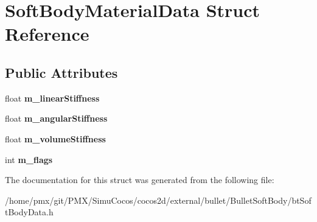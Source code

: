 \hypertarget{structSoftBodyMaterialData}{}\section{Soft\+Body\+Material\+Data Struct Reference}
\label{structSoftBodyMaterialData}
\subsection*{Public Attributes}
\begin{DoxyCompactItemize}
\item 
\mbox{\label{structSoftBodyMaterialData_a10a3ccf32511c85b9eb62ad97553312d}} 
float {\bfseries m\+\_\+linear\+Stiffness}
\item 
\mbox{\label{structSoftBodyMaterialData_adb5b47c720ed05e42e12c74eedba9d8b}} 
float {\bfseries m\+\_\+angular\+Stiffness}
\item 
\mbox{\label{structSoftBodyMaterialData_a564fb4279b51e7cf3aa0e7844f55f2c8}} 
float {\bfseries m\+\_\+volume\+Stiffness}
\item 
\mbox{\label{structSoftBodyMaterialData_a89ac411b007b81cd72bb7fa42176f205}} 
int {\bfseries m\+\_\+flags}
\end{DoxyCompactItemize}


The documentation for this struct was generated from the following file\+:\begin{DoxyCompactItemize}
\item 
/home/pmx/git/\+P\+M\+X/\+Simu\+Cocos/cocos2d/external/bullet/\+Bullet\+Soft\+Body/bt\+Soft\+Body\+Data.\+h\end{DoxyCompactItemize}
